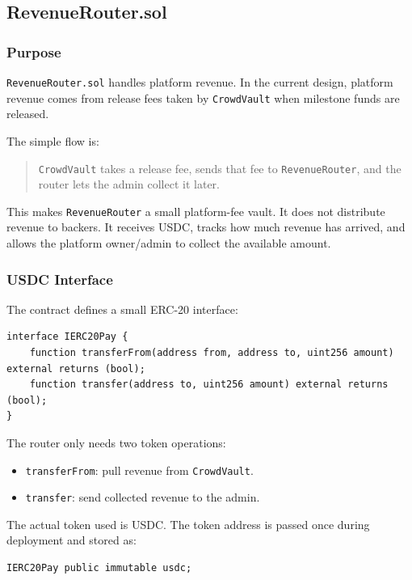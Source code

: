 \documentclass[11pt,a4paper]{article}
\begin{document}
\subsection{RevenueRouter.sol}

\subsubsection{Purpose}

\texttt{RevenueRouter.sol} handles platform revenue. In the current design, platform revenue comes from release fees taken by \texttt{CrowdVault} when milestone funds are released.

The simple flow is:

\begin{quote}
\texttt{CrowdVault} takes a release fee, sends that fee to \texttt{RevenueRouter}, and the router lets the admin collect it later.
\end{quote}

This makes \texttt{RevenueRouter} a small platform-fee vault. It does not distribute revenue to backers. It receives USDC, tracks how much revenue has arrived, and allows the platform owner/admin to collect the available amount.

\subsubsection{USDC Interface}

The contract defines a small ERC-20 interface:

\begin{lstlisting}
interface IERC20Pay {
    function transferFrom(address from, address to, uint256 amount) external returns (bool);
    function transfer(address to, uint256 amount) external returns (bool);
}
\end{lstlisting}

The router only needs two token operations:

\begin{itemize}
  \item \texttt{transferFrom}: pull revenue from \texttt{CrowdVault}.
  \item \texttt{transfer}: send collected revenue to the admin.
\end{itemize}

The actual token used is USDC. The token address is passed once during deployment and stored as:

\begin{lstlisting}
IERC20Pay public immutable usdc;
\end{lstlisting}
\end{document}
